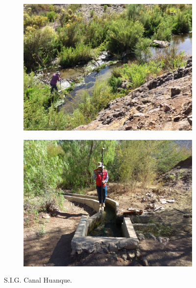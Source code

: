 \documentclass[]{article}
\begin{document}
\begin{figure}[H]
  \centering
\begin{subfigure}{.45\textwidth}
\hfill
  \includegraphics[angle= 180, width=\textwidth]{Foto/h1.jpg}
\end{subfigure}
\hfill
\begin{subfigure}{.45\textwidth}
\hfill
  \includegraphics[width=\textwidth]{Foto/h2.jpg} 
\end{subfigure}
\caption{S.I.G. Canal Huanque.}
\end{figure}
\end{document}
